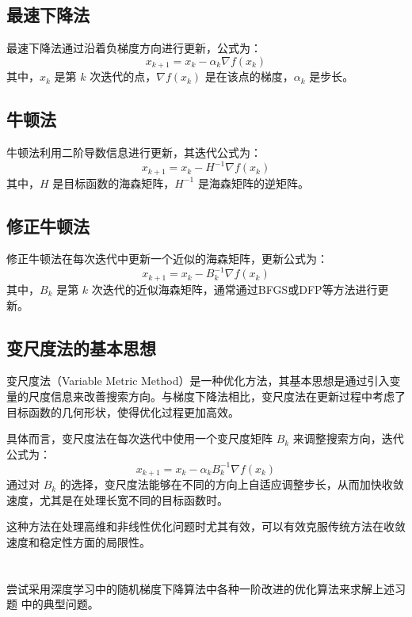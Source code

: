 \documentclass[a4paper]{article}
\begin{document}
\subsection{最速下降法}

最速下降法通过沿着负梯度方向进行更新，公式为：
\[
x_{k+1} = x_k - \alpha_k \nabla f(x_k)
\]
其中，$x_k$ 是第 $k$ 次迭代的点，$\nabla f(x_k)$ 是在该点的梯度，$\alpha_k$ 是步长。

\subsection{牛顿法}

牛顿法利用二阶导数信息进行更新，其迭代公式为：
\[
x_{k+1} = x_k - H^{-1} \nabla f(x_k)
\]
其中，$H$ 是目标函数的海森矩阵，$H^{-1}$ 是海森矩阵的逆矩阵。

\subsection{修正牛顿法}

修正牛顿法在每次迭代中更新一个近似的海森矩阵，更新公式为：
\[
x_{k+1} = x_k - B_k^{-1} \nabla f(x_k)
\]
其中，$B_k$ 是第 $k$ 次迭代的近似海森矩阵，通常通过BFGS或DFP等方法进行更新。

\subsection{变尺度法的基本思想}

变尺度法（Variable Metric Method）是一种优化方法，其基本思想是通过引入变量的尺度信息来改善搜索方向。与梯度下降法相比，变尺度法在更新过程中考虑了目标函数的几何形状，使得优化过程更加高效。

具体而言，变尺度法在每次迭代中使用一个变尺度矩阵 $B_k$ 来调整搜索方向，迭代公式为：
\[
x_{k+1} = x_k - \alpha_k B_k^{-1} \nabla f(x_k)
\]
通过对 $B_k$ 的选择，变尺度法能够在不同的方向上自适应调整步长，从而加快收敛速度，尤其是在处理长宽不同的目标函数时。

这种方法在处理高维和非线性优化问题时尤其有效，可以有效克服传统方法在收敛速度和稳定性方面的局限性。


\section{}

尝试采用深度学习中的随机梯度下降算法中各种一阶改进的优化算法来求解上述习题
中的典型问题。

\section{}
\end{document}
